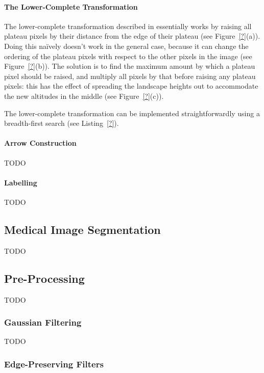 \paragraph{The Lower-Complete Transformation}

The lower-complete transformation described in \cite{meijster98} essentially works by raising all plateau pixels by their distance from the edge of their plateau (see Figure~\ref{?}(a)). Doing this na\"ively doesn't work in the general case, because it can change the ordering of the plateau pixels with respect to the other pixels in the image (see Figure~\ref{?}(b)). The solution is to find the maximum amount by which a plateau pixel should be raised, and multiply all pixels by that before raising any plateau pixels: this has the effect of spreading the landscape heights out to accommodate the new altitudes in the middle (see Figure~\ref{?}(c)).

The lower-complete transformation can be implemented straightforwardly using a breadth-first search (see Listing~\ref{?}).

\paragraph{Arrow Construction}

TODO

\paragraph{Labelling}

TODO

\subsection{Medical Image Segmentation}

TODO

\subsection{Pre-Processing}

TODO

\subsubsection{Gaussian Filtering}

TODO

\subsubsection{Edge-Preserving Filters}

